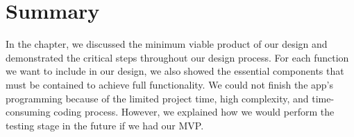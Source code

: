 \documentclass[11pt]{article}
\begin{document}
\section{Summary}
In the chapter, we discussed the minimum viable product of our design and demonstrated the critical steps throughout our design process. For each function we want to include in our design, we also showed the essential components that must be contained to achieve full functionality. We could not finish the app's programming because of the limited project time, high complexity, and time-consuming coding process. However, we explained how we would perform the testing stage in the future if we had our MVP.
\end{document}
